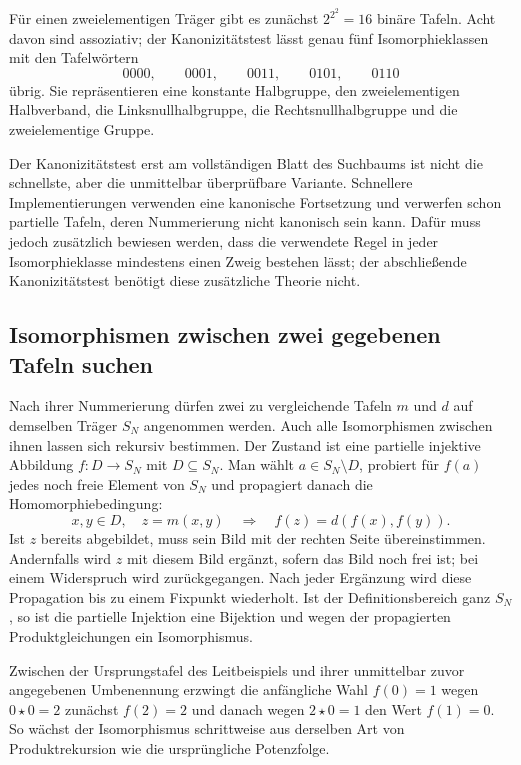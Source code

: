 \documentclass[main.tex]{subfiles}
\begin{document}
Für einen zweielementigen Träger gibt es zunächst
\(2^{2^2}=16\) binäre Tafeln.  Acht davon sind assoziativ; der
Kanonizitätstest lässt genau fünf Isomorphieklassen mit den Tafelwörtern
\[
  0000,\qquad 0001,\qquad 0011,\qquad 0101,\qquad 0110
\]
übrig.  Sie repräsentieren eine konstante Halbgruppe, den zweielementigen
Halbverband, die Linksnullhalbgruppe, die Rechtsnullhalbgruppe und die
zweielementige Gruppe.

Der Kanonizitätstest erst am vollständigen Blatt des Suchbaums ist nicht die
schnellste, aber die unmittelbar überprüfbare Variante.  Schnellere
Implementierungen verwenden eine kanonische Fortsetzung und verwerfen schon
partielle Tafeln, deren Nummerierung nicht kanonisch sein kann.  Dafür muss
jedoch zusätzlich bewiesen werden, dass die verwendete Regel in jeder
Isomorphieklasse mindestens einen Zweig bestehen lässt; der abschließende
Kanonizitätstest benötigt diese zusätzliche Theorie nicht.


\subsection{Isomorphismen zwischen zwei gegebenen Tafeln suchen}

Nach ihrer Nummerierung dürfen zwei zu vergleichende Tafeln \(m\) und \(d\)
auf demselben Träger \(S_N\) angenommen werden.  Auch alle Isomorphismen
zwischen ihnen lassen sich rekursiv bestimmen.  Der Zustand ist eine
partielle injektive Abbildung \(f\colon D\to S_N\) mit
\(D\subseteq S_N\).  Man wählt \(a\in S_N\setminus D\), probiert für \(f(a)\)
jedes noch freie Element von \(S_N\) und propagiert danach die
Homomorphiebedingung:
\[
  x,y\in D,\quad z=m(x,y)
  \quad\Longrightarrow\quad
  f(z)=d(f(x),f(y)).
\]
Ist \(z\) bereits abgebildet, muss sein Bild mit der rechten Seite
übereinstimmen.  Andernfalls wird \(z\) mit diesem Bild ergänzt, sofern das
Bild noch frei ist; bei einem Widerspruch wird zurückgegangen.  Nach jeder
Ergänzung wird diese Propagation bis zu einem Fixpunkt wiederholt.  Ist der
Definitionsbereich ganz \(S_N\), so ist die partielle Injektion eine
Bijektion und wegen der propagierten Produktgleichungen ein Isomorphismus.

Zwischen der Ursprungstafel des Leitbeispiels und ihrer unmittelbar zuvor
angegebenen Umbenennung erzwingt die anfängliche Wahl \(f(0)=1\) wegen
\(0\star0=2\) zunächst \(f(2)=2\) und danach wegen \(2\star0=1\) den Wert
\(f(1)=0\).  So wächst der Isomorphismus schrittweise aus derselben Art von
Produktrekursion wie die ursprüngliche Potenzfolge.
\end{document}
